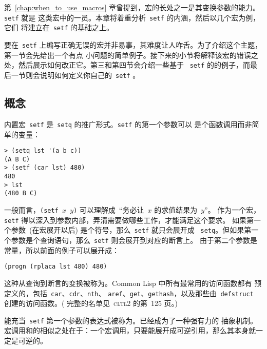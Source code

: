 
\chapter{\gv{}}
\label{chap:generalized_variables}

第~\ref{chap:when_to_use_macros} 章曾提到，宏的长处之一是其变换参数的能力。\verb|setf| 就是
这类宏中的一员。本章将着重分析~\verb|setf| 的内涵，然后以几个宏为例，它们
将建立在~\verb|setf| 的基础之上。

要在~\verb|setf| 上编写正确无误的宏并非易事，其难度让人咋舌。为了介绍这个主题，第一节会先给出一个有点
小问题的简单例子。接下来的小节将解释该宏的错误之处，然后展示如何改正它。第三和第四节会介绍一些基于
~\verb|setf| 的\utility{}的例子，而最后一节则会说明如何定义你自己的~\verb|setf|
\inversion。

\section{概念}
\label{sec:gv:the_concept}

内置宏~\verb|setf| 是~\verb|setq| 的推广形式。\verb|setf| 的第一个参数可以
是个函数调用而非简单的变量：
\begin{lstlisting}
> (setq lst '(a b c))
(A B C)
> (setf (car lst) 480)
480
> lst
(480 B C)
\end{lstlisting}

一般而言，\texttt{(setf $x$ $y$)} 可以理解成~``务必让~$x$ 的求值结果为~$y$''。
作为一个宏，\verb|setf| 得以深入到参数内部，弄清需要做哪些工作，才能满足这个要求。
如果第一个参数~(在宏展开以后) 是个符号，那么~\verb|setf| 就只会展开成
~\verb|setq|。但如果第一个参数是个查询语句，那么~\verb|setf| 则会展开到对应的断言上。
由于第二个参数是常量，所以前面的例子可以展开成：
\begin{lstlisting}
(progn (rplaca lst 480) 480)
\end{lstlisting}
这种从查询到断言的变换被称为\emph{\inversion}。Common Lisp 中所有最常用的访问函数都有
预定义的\inversion，包括~\verb|car|、\verb|cdr|、\verb|nth|、
\verb|aref|、\verb|get|、\verb|gethash|，以及那些由~\verb|defstruct| 创建的访问函数。(
完整的名单见~\textsc{cltl}2 的第~125 页。)

能充当~\verb|setf| 第一个参数的表达式被称为\emph{\gv{}}。\gv{}已经成为了一种强有力的
抽象机制。宏调用和\gv{}的相似之处在于：一个宏调用，只要能展开成可逆引用，那么其本身就一定是可逆的。

